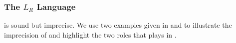 \begin{comment}
The $L_C(p_{\color{purple}{\mathtt{O1}},\texttt{v}})=\hat{\mathtt{c1}}\hat{\mathtt{c3}}$ in \Cref{eq:LFCPathCGPreciseI} but \LC$(p_{\color{purple}{\mathtt{O1}},\texttt{v}})=\hat{\mathtt{c1}}\check{\mathtt{c1}}$ in \Cref{eq:alterLFPath}, resulting in 
inconsistent calling contexts for \texttt{v} (i.e., $[\mathtt{c3}, \mathtt{c1}]$ and \emptyctx ~ respectively) when the parameter passing is completed.
\end{comment}



\subsubsection{The $L_R$ Language}
\label{subsubsec:newLR}


\LFC is sound but imprecise. We  use two examples given in
 and  to illustrate the imprecision of \LFC and highlight the two roles that \LR plays
in \LFCR. 


